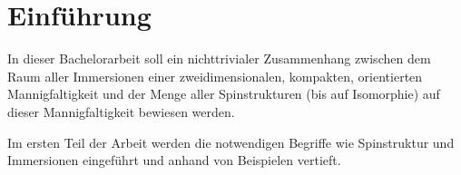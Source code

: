 \section*{Einführung}

In dieser Bachelorarbeit soll ein nichttrivialer Zusammenhang zwischen
dem Raum aller Immersionen einer zweidimensionalen, kompakten, orientierten Mannigfaltigkeit und der Menge aller Spinstrukturen (bis auf Isomorphie) auf dieser Mannigfaltigkeit
bewiesen werden.

Im ersten Teil der Arbeit werden die notwendigen Begriffe wie Spinstruktur und Immersionen eingeführt und anhand von Beispielen vertieft.